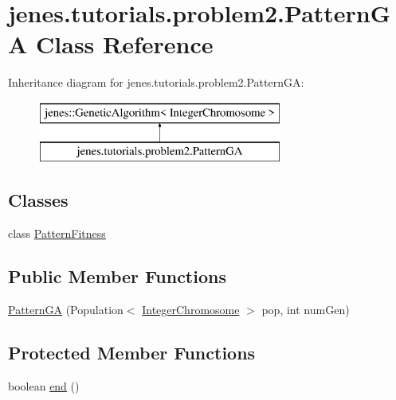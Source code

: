 \hypertarget{classjenes_1_1tutorials_1_1problem2_1_1_pattern_g_a}{\section{jenes.\-tutorials.\-problem2.\-Pattern\-G\-A Class Reference}
\label{classjenes_1_1tutorials_1_1problem2_1_1_pattern_g_a}
}
Inheritance diagram for jenes.\-tutorials.\-problem2.\-Pattern\-G\-A\-:\begin{figure}[H]
\begin{center}
\leavevmode
\includegraphics[height=2.000000cm]{classjenes_1_1tutorials_1_1problem2_1_1_pattern_g_a}
\end{center}
\end{figure}
\subsection*{Classes}
\begin{DoxyCompactItemize}
\item 
class \hyperlink{classjenes_1_1tutorials_1_1problem2_1_1_pattern_g_a_1_1_pattern_fitness}{Pattern\-Fitness}
\end{DoxyCompactItemize}
\subsection*{Public Member Functions}
\begin{DoxyCompactItemize}
\item 
\hyperlink{classjenes_1_1tutorials_1_1problem2_1_1_pattern_g_a_a009d1901fabdcabacb443297eb2295ce}{Pattern\-G\-A} (Population$<$ \hyperlink{classjenes_1_1chromosome_1_1_integer_chromosome}{Integer\-Chromosome} $>$ pop, int num\-Gen)
\end{DoxyCompactItemize}
\subsection*{Protected Member Functions}
\begin{DoxyCompactItemize}
\item 
boolean \hyperlink{classjenes_1_1tutorials_1_1problem2_1_1_pattern_g_a_a3785b5c77bc9bfab62fd3ef7c6ea8fb9}{end} ()
\end{DoxyCompactItemize}
